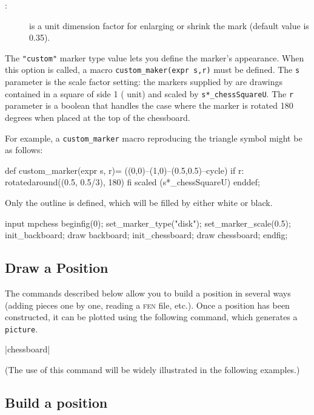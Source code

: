 \documentclass[english]{ltxdoc}
\begin{document}
\begin{description}
  \item[:] is a unit dimension factor for enlarging or
  shrink the mark (default value is \num{0.35}).
\end{description}

The \lstinline+"custom"+ marker type value lets you define the marker's
appearance. When this option is called, a
macro \MP{} \lstinline+custom_maker(expr s,r)+ must be defined. The
\lstinline+s+ parameter is the scale factor setting: the markers supplied by
\mpchess are drawings contained in a square of side 1 (\MP{} unit) and scaled
by \lstinline+s*_chessSquareU+. The \lstinline+r+ parameter is a boolean that
handles the case where the marker is rotated 180 degrees 
when placed at the top of the chessboard. 

For example, a \lstinline+custom_marker+ macro reproducing the triangle symbol might be as follows:
\begin{mpcode}
def custom_marker(expr s, r)=
  ((0,0)--(1,0)--(0.5,0.5)--cycle) if r: rotatedaround((0.5, 0.5/3), 180) fi scaled (s*_chessSquareU)
enddef;
\end{mpcode}

Only the outline is defined, which will be filled by either white or black.


\begin{ExempleMP}
input mpchess
beginfig(0);
set_marker_type("disk");
set_marker_scale(0.5);
init_backboard;
draw backboard;
init_chessboard;
draw chessboard;
endfig;
\end{ExempleMP}
\subsection{Draw a Position}

The commands described below allow you to build a position in several ways
(adding pieces one by one, reading a \textsc{fen} file, etc.). Once a position
has been constructed, it can be plotted 
using the following command, which generates a \MP{} \lstinline+picture+.


\commande|chessboard|\smallskip \label{com:chessboard}

(The use of this command will be widely illustrated in the following examples.)

\subsection{Build a position}
\end{document}
